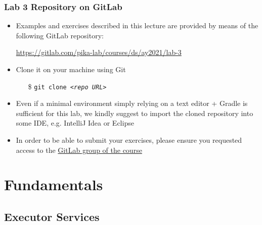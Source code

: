 \documentclass{beamer}\mode<presentation>{\usetheme{AMSCesenaPurpleAndGold}}
\newcommand{\labN}{3}
\newcommand{\labGroup}{https://gitlab.com/pika-lab/courses/ds/ay2021}
\newcommand{\labRepo}{\labGroup/lab-\labN}
\begin{document}
\begin{frame}
\frametitle{Lab \labN{} Repository on GitLab}

	\begin{itemize}
		\item Examples and exercises described in this lecture are provided by means of the following GitLab repository:
		\begin{center}
			\url{\labRepo}
		\end{center}
		
		\vfill
		
		\item Clone it on your machine using Git
		\begin{itemize}
		    \item[\$] \texttt{git clone \textit{<repo URL>}}
		\end{itemize}
		
		\vfill
		
		\item Even if a minimal environment simply relying on a text editor + Gradle is sufficient for this lab, we kindly suggest to import the cloned repository into some IDE, e.g. IntelliJ Idea or Eclipse
		
		\vfill
		
		\item In order to be able to submit your exercises, please ensure you requested access to the \href{\labGroup}{GitLab group of the course}
	\end{itemize}

\end{frame}

\section{Fundamentals}

\subsection{Executor Services}
\end{document}

